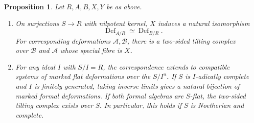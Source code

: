 \documentclass[12pt,a4paper,english,reqno]{amsart}
\numberwithin{equation}{section}
\theoremstyle{plain}
\newtheorem{proposition}[theorem]{Proposition}
\theoremstyle{definition}
\begin{document}
\begin{proposition}\label{prop:standard-derived-deformations}
Let $R,A,B,X,Y$ be as above.
\begin{enumerate}
\item On surjections $S\to R$ with nilpotent kernel, $X$ induces a
natural isomorphism
\[
 \operatorname{Def}_{A/R}\simeq\operatorname{Def}_{B/R}.
\]
For corresponding deformations $\mathcal A,\mathcal B$, there is
a two-sided tilting complex over $\mathcal B$ and $\mathcal A$
whose special fibre is $X$.
\item For any ideal $I$ with $S/I=R$, the correspondence extends
to compatible systems of marked flat deformations over the
$S/I^n$. If $S$ is $I$-adically complete and $I$ is finitely
generated, taking inverse limits gives a natural bijection
of marked formal deformations. If both formal algebras are
$S$-flat, the two-sided tilting complex exists over $S$.
In particular, this holds if $S$ is Noetherian and complete.
\end{enumerate}
\end{proposition}
\end{document}
